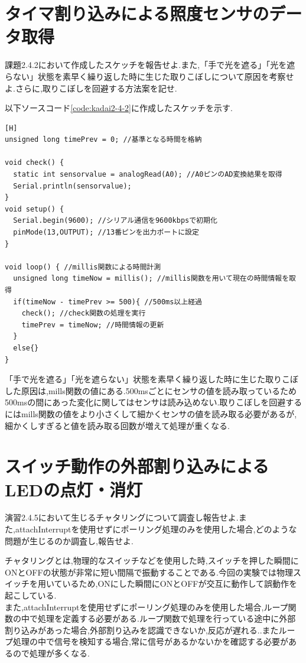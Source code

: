 \documentclass{jarticle}
\begin{document}
\section{タイマ割り込みによる照度センサのデータ取得}
課題2.4.2において作成したスケッチを報告せよ.また,「手で光を遮る」「光を遮らない」状態を素早く繰り返した時に生じた取りこぼしについて原因を考察せよ.さらに,取りこぼしを回避する方法案を記せ.

以下ソースコード\ref{code:kadai2-4-2}に作成したスケッチを示す.


\begin{lstlisting}[caption = 課題2.4.2,label=code:kadai2-4-2][H]
unsigned long timePrev = 0; //基準となる時間を格納

void check() {
  static int sensorvalue = analogRead(A0); //A0ピンのAD変換結果を取得
  Serial.println(sensorvalue);
}
void setup() {
  Serial.begin(9600); //シリアル通信を9600kbpsで初期化
  pinMode(13,OUTPUT); //13番ピンを出力ポートに設定
}

void loop() { //millis関数による時間計測
  unsigned long timeNow = millis(); //millis関数を用いて現在の時間情報を取得
  if(timeNow - timePrev >= 500){ //500ms以上経過
    check(); //check関数の処理を実行
    timePrev = timeNow; //時間情報の更新
  }
  else{}
}
\end{lstlisting}
「手で光を遮る」「光を遮らない」状態を素早く繰り返した時に生じた取りこぼした原因は,mills関数の値にある.500msごとにセンサの値を読み取っているため500msの間にあった変化に関してはセンサは読み込めない.取りこぼしを回避するにはmills関数の値をより小さくして細かくセンサの値を読み取る必要があるが,細かくしすぎると値を読み取る回数が増えて処理が重くなる.

\section{スイッチ動作の外部割り込みによるLEDの点灯・消灯}
演習2.4.5において生じるチャタリングについて調査し報告せよ.また,attachInterruptを使用せずにポーリング処理のみを使用した場合,どのような問題が生じるのか調査し,報告せよ.

チャタリングとは,物理的なスイッチなどを使用した時,スイッチを押した瞬間にONとOFFの状態が非常に短い間隔で振動することである.今回の実験では物理スイッチを用いているため,ONにした瞬間にONとOFFが交互に動作して誤動作を起こしている.\\
また,attachInterruptを使用せずにポーリング処理のみを使用した場合,ループ関数の中で処理を定義する必要がある.ループ関数で処理を行っている途中に外部割り込みがあった場合,外部割り込みを認識できないか,反応が遅れる..またループ処理の中で信号を検知する場合,常に信号があるかないかを確認する必要があるので処理が多くなる.
\end{document}

